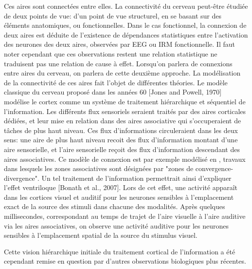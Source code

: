 \documentclass[../main]{subfiles}
\begin{document}
Ces aires sont connectées entre elles. La connectivité du cerveau peut-être étudiée de deux points de vue: d'un point de vue structurel, en se basant sur des éléments anatomiques, ou fonctionnelles. Dans le cas fonctionnel, la connexion de deux aires est déduite de l'existence de dépendances statistiques entre l'activation des neurones des deux aires, observées par EEG ou IRM fonctionnelle. Il faut noter cependant que ces observations restent une relation statistique ne traduisent pas une relation de cause à effet. Lorsqu'on parlera de connexions entre aires du cerveau, on parlera de cette deuxième approche.
La modélisation de la connectivité de ces aires fait l'objet de différentes théories. Le modèle classique du cerveau proposé dans les années 60 [Jones and Powell, 1970] modélise le cortex comme un système de traitement hiérarchique et séquentiel de l'information. Les différents flux sensoriels seraient traités par des aires corticales dédiées, et leur mise en relation dans des aires associative qui s'occuperaient de tâches de plus haut niveau. Ces flux d'informations circuleraient dans les deux sens: une aire de plus haut niveau recoit des flux d'information montant d'une aire sensorielle, et l'aire sensorielle reçoit des flux d'information descendant des aires associatives. Ce modèle de connexion est par exemple modélisé en \cite{damasio_time-locked_1989}, travaux dans lesquels les zones associatives sont désignées par "zones de convergence-divergence".
Un tel traitement de l'information permettrait ainsi d'expliquer l'effet ventriloque [Bonath et al., 2007]. Lors de cet effet, une activité apparaît dans les cortices visuel et auditif pour les neurones sensibles à l'emplacement exact de la source des stimuli dans chacune des modalités. Après quelques millisecondes, correspondant au temps de trajet de l'aire visuelle à l'aire auditive via les aires associatives, on observe une activité auditive pour les neurones sensibles à l'emplacement spatial de la source du stimulus visuel.

Cette vision hiérarchique initiale du traitement cortical de l'information a été cependant remise en question par d'autres observations biologiques plus récentes. 
\end{document}
